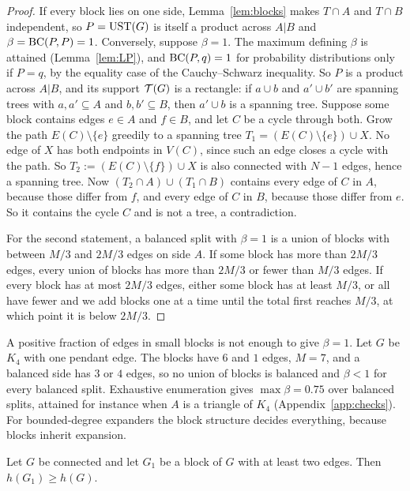 \begin{proof}
If every block lies on one side, Lemma~\ref{lem:blocks} makes $T\cap A$ and $T\cap B$ independent, so $P=\mathrm{UST}(G)$ is itself a product across $A|B$ and $\beta=\mathrm{BC}(P,P)=1$. Conversely, suppose $\beta=1$. The maximum defining $\beta$ is attained (Lemma~\ref{lem:LP}), and $\mathrm{BC}(P,q)=1$ for probability distributions only if $P=q$, by the equality case of the Cauchy--Schwarz inequality. So $P$ is a product across $A|B$, and its support $\mathcal{T}(G)$ is a rectangle: if $a\cup b$ and $a'\cup b'$ are spanning trees with $a,a'\subseteq A$ and $b,b'\subseteq B$, then $a'\cup b$ is a spanning tree. Suppose some block contains edges $e\in A$ and $f\in B$, and let $C$ be a cycle through both. Grow the path $E(C)\setminus\{e\}$ greedily to a spanning tree $T_1=(E(C)\setminus\{e\})\cup X$. No edge of $X$ has both endpoints in $V(C)$, since such an edge closes a cycle with the path. So $T_2:=(E(C)\setminus\{f\})\cup X$ is also connected with $N-1$ edges, hence a spanning tree. Now $(T_2\cap A)\cup(T_1\cap B)$ contains every edge of $C$ in $A$, because those differ from $f$, and every edge of $C$ in $B$, because those differ from $e$. So it contains the cycle $C$ and is not a tree, a contradiction.

For the second statement, a balanced split with $\beta=1$ is a union of blocks with between $M/3$ and $2M/3$ edges on side $A$. If some block has more than $2M/3$ edges, every union of blocks has more than $2M/3$ or fewer than $M/3$ edges. If every block has at most $2M/3$ edges, either some block has at least $M/3$, or all have fewer and we add blocks one at a time until the total first reaches $M/3$, at which point it is below $2M/3$.
\end{proof}

A positive fraction of edges in small blocks is not enough to give $\beta=1$. Let $G$ be $K_4$ with one pendant edge. The blocks have $6$ and $1$ edges, $M=7$, and a balanced side has $3$ or $4$ edges, so no union of blocks is balanced and $\beta<1$ for every balanced split. Exhaustive enumeration gives $\max\beta=0.75$ over balanced splits, attained for instance when $A$ is a triangle of $K_4$ (Appendix~\ref{app:checks}). For bounded-degree expanders the block structure decides everything, because blocks inherit expansion.

\begin{lemma}\label{lem:block-expansion}
Let $G$ be connected and let $G_1$ be a block of $G$ with at least two edges. Then $h(G_1)\ge h(G)$.
\end{lemma}


